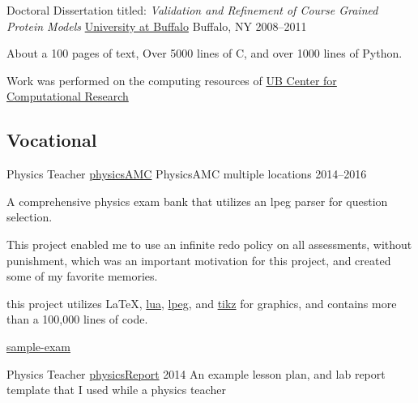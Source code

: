 \begin{cventries}
  \cventry
    {Doctoral Dissertation titled: \emph{Validation and Refinement of Course Grained Protein Models}}
    {\href{www.buffalo.edu}{University at Buffalo}}
    {Buffalo, NY}
    {2008--2011}
{
\begin{cvitems}
    \item {About a 100 pages of text, Over 5000 lines of C, and over 1000 lines of Python.}
    \item {Work was performed on the computing resources of \href{ccr.buffalo.edu}{UB Center for Computational Research}}
\end{cvitems}
}

\subsection{Vocational}

  \cventry
    {Physics Teacher} %
    {\href{https://github.com/jphafner/physicsAMC}{physicsAMC}} %
    {PhysicsAMC}
    {multiple locations}
    {2014--2016} %
{
\begin{cvitems}
    \item {A comprehensive physics exam bank that utilizes an lpeg parser for question selection.}
    \item {This project enabled me to use an infinite redo policy on all assessments, without punishment, which was an important motivation for this project, and created some of my favorite memories.}
    \item {this project utilizes \LaTeX, \href{lua.org}{lua}, \href{http://www.inf.puc-rio.br/~roberto/lpeg/}{lpeg}, and \href{http://www.texample.net/tikz/}{tikz} for graphics, and contains more than a 100,000 lines of code.}
    \item { \href{https://github.com/jphafner/physicsAMC/blob/mc-project/kinematics-exam/sample-exam.pdf}{sample-exam}}
\end{cvitems}
}

  \cventry
    {Physics Teacher} %
    {\href{https://github.com/jphafner/physicsReport}{physicsReport}}
    {2014}
    {An example lesson plan, and lab report template that I used while a physics teacher}


\end{cventries}

